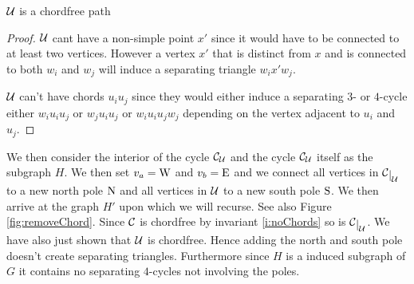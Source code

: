 
\begin{lemma}
$\mathcal{U}$ is a chordfree path
\end{lemma}
\begin{proof}
$\mathcal{U}$ cant have a non-simple point $x'$ since it would have to be connected to at least two vertices. However a vertex $x'$ that is distinct from $x$ and is connected to both $w_i$ and $w_j$ will induce a separating triangle $w_i x' w_j$.

$\mathcal{U}$ can't have chords $u_i u_j$ since they would either induce a separating $3$- or $4$-cycle either $w_i u_i u_j$ or $w_j u_i u_j$ or $w_i u_i u_j w_j$ depending on the vertex adjacent to $u_i$ and $u_j$.
\end{proof}


We then consider the interior of the cycle $\mathcal{C}_{\mathcal{U}}$ and the cycle $\mathcal{C}_{\mathcal{U}}$ itself as the subgraph $H$. We then set $v_a = \mathrm{W}$ and $v_b = \mathrm{E}$ and we connect all vertices in $\restC{\U}$ to a new north pole $\mathrm{N}$ and all vertices in $\mathcal{U}$ to a new south pole $\mathrm{S}$. We then arrive at the graph $H'$ upon which we will recurse. See also Figure \ref{fig:removeChord}. Since $\mathcal{C}$ is chordfree by invariant \ref{i:noChords} so is $\restC{\U}$. We have also just shown that $\mathcal{U}$ is chordfree. Hence adding the north and south pole doesn't create separating triangles. Furthermore since $H$ is a induced subgraph of $G$ it contains no separating $4$-cycles not involving the poles.



